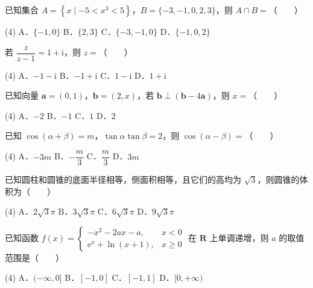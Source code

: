 \begin{question}
已知集合 $A=\left\{x\mid -5<x^{3}<5\right\}$，$B=\{-3,-1,0,2,3\}$，则 $A\cap B=$（　　）

\begin{gkopts}(4)
\task A．$\{-1,0\}$
\task B．$\{2,3\}$
\task C．$\{-3,-1,0\}$
\task D．$\{-1,0,2\}$
\end{gkopts}

\end{question}
\begin{question}
若 $\dfrac{z}{z-1}=1+\mathrm{i}$，则 $z=$（　　）

\begin{gkopts}(4)
\task A．$-1-\mathrm{i}$
\task B．$-1+\mathrm{i}$
\task C．$1-\mathrm{i}$
\task D．$1+\mathrm{i}$
\end{gkopts}

\end{question}
\begin{question}
已知向量 $\boldsymbol a=(0,1)$，$\boldsymbol b=(2,x)$，若 $\boldsymbol b\perp(\boldsymbol b-4\boldsymbol a)$，则 $x=$（　　）

\begin{gkopts}(4)
\task A．$-2$
\task B．$-1$
\task C．$1$
\task D．$2$
\end{gkopts}

\end{question}
\begin{question}
已知 $\cos(\alpha+\beta)=m$，$\tan\alpha\tan\beta=2$，则 $\cos(\alpha-\beta)=$（　　）

\begin{gkopts}(4)
\task A．$-3m$
\task B．$-\dfrac m3$
\task C．$\dfrac m3$
\task D．$3m$
\end{gkopts}

\end{question}
\begin{question}
已知圆柱和圆锥的底面半径相等，侧面积相等，且它们的高均为 $\sqrt3$，则圆锥的体积为（　　）

\begin{gkopts}(4)
\task A．$2\sqrt3\pi$
\task B．$3\sqrt3\pi$
\task C．$6\sqrt3\pi$
\task D．$9\sqrt3\pi$
\end{gkopts}

\end{question}
\begin{question}
已知函数 $f(x)=\begin{cases}-x^{2}-2ax-a,&x<0\\ \mathrm{e}^{x}+\ln(x+1),&x\ge0\end{cases}$ 在 $\mathbf R$ 上单调递增，则 $a$ 的取值范围是（　　）

\begin{gkopts}(4)
\task A．$(-\infty,0]$
\task B．$[-1,0]$
\task C．$[-1,1]$
\task D．$[0,+\infty)$
\end{gkopts}

\end{question}
